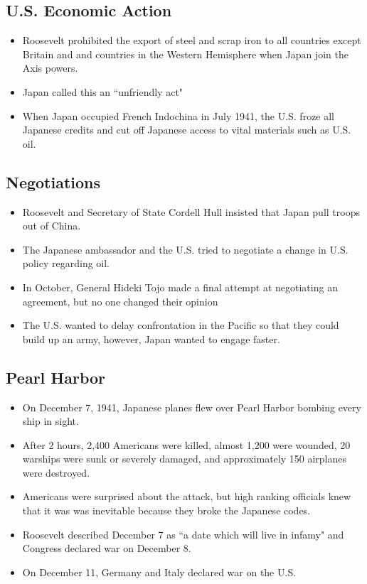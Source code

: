 \documentclass[12pt]{article} %
\begin{document}
	\subsection{U.S. Economic Action}
	\begin{itemize}
		\item Roosevelt prohibited the export of steel and scrap iron to all countries except Britain and 
			and countries in the Western Hemisphere when Japan join the Axis powers.
		\item Japan called this an ``unfriendly act"
		\item When Japan occupied French Indochina in July 1941, the U.S. froze all Japanese credits and 
			cut off Japanese access to vital materials such as U.S. oil.
	\end{itemize}

	\subsection{Negotiations}
	\begin{itemize}
		\item Roosevelt  and Secretary of State Cordell Hull insisted that Japan pull troops out of China.
		\item The Japanese ambassador and the U.S. tried to negotiate a change in U.S. policy regarding 
			oil.
		\item In October, General Hideki Tojo made a final attempt at negotiating an agreement, but no 
			one changed their opinion
		\item The U.S. wanted to delay confrontation in the Pacific so that they could build up an army, 
			however, Japan wanted to engage faster.
	\end{itemize}

	\subsection{Pearl Harbor}
	\begin{itemize}
		\item On December 7, 1941, Japanese planes flew over Pearl Harbor bombing every ship in sight.
		\item After 2 hours, 2,400 Americans were killed, almost 1,200 were wounded, 20 warships were
			sunk or severely damaged, and approximately 150 airplanes were destroyed.
		\item Americans were surprised about the attack, but high ranking officials knew that it was 
			was inevitable because they broke the Japanese codes.
		\item Roosevelt described December 7 as ``a date which will live in infamy" and Congress declared
			war on December 8.
		\item On December 11, Germany and Italy declared war on the U.S.
	\end{itemize}
\end{document}
